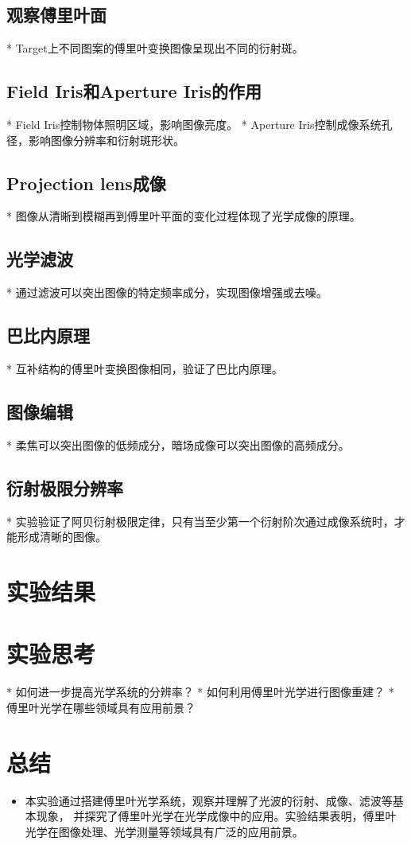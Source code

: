 \documentclass{ctexart}
\begin{document}
\subsection{观察傅里叶面}
* Target上不同图案的傅里叶变换图像呈现出不同的衍射斑。
\subsection{Field Iris和Aperture Iris的作用}
* Field Iris控制物体照明区域，影响图像亮度。
* Aperture Iris控制成像系统孔径，影响图像分辨率和衍射斑形状。
\subsection{Projection lens成像}
* 图像从清晰到模糊再到傅里叶平面的变化过程体现了光学成像的原理。
\subsection{光学滤波}
* 通过滤波可以突出图像的特定频率成分，实现图像增强或去噪。
\subsection{巴比内原理}
* 互补结构的傅里叶变换图像相同，验证了巴比内原理。
\subsection{图像编辑}
* 柔焦可以突出图像的低频成分，暗场成像可以突出图像的高频成分。
\subsection{衍射极限分辨率}
* 实验验证了阿贝衍射极限定律，只有当至少第一个衍射阶次通过成像系统时，才能形成清晰的图像。


\section{实验结果}

\section{实验思考}
* 如何进一步提高光学系统的分辨率？
* 如何利用傅里叶光学进行图像重建？
* 傅里叶光学在哪些领域具有应用前景？

\section{总结}
\begin{itemize}
  \item 本实验通过搭建傅里叶光学系统，观察并理解了光波的衍射、成像、滤波等基本现象，
  并探究了傅里叶光学在光学成像中的应用。实验结果表明，傅里叶光学在图像处理、光学测量等领域具有广泛的应用前景。

\end{itemize}
\end{document}
